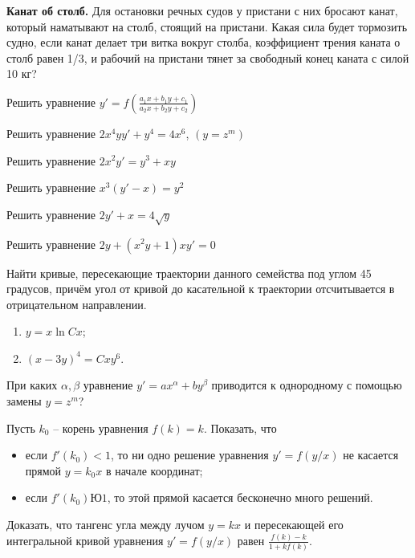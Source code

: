 \begin{task}
\textbf{Канат об столб.} Для остановки речных судов у пристани с них бросают канат, который наматывают на столб, стоящий на пристани. Какая сила будет тормозить судно, если канат делает три витка вокруг столба, коэффициент трения каната о столб равен 1/3, и рабочий на пристани тянет за свободный конец каната с силой 10 кг?
\end{task}

\begin{task}
Решить уравнение $y'=f(\frac{a_1x+b_1y+c_1}{a_2x+b_2y+c_2})$
\end{task}

\begin{task}
Решить уравнение $2x^4yy'+y^4=4x^6$, $(y=z^m)$
\end{task}

\begin{task}
Решить уравнение $2x^2y'=y^3+xy$
\end{task}

\begin{task}
Решить уравнение $x^3(y'-x)=y^2$
\end{task}

\begin{task}
Решить уравнение $2y'+x=4\sqrt{y}$
\end{task}

\begin{task}
Решить уравнение $2y+(x^2y+1)xy'=0$
\end{task}

\begin{task}
Найти кривые, пересекающие траектории данного семейства под углом 45 градусов, причём угол от  кривой до касательной к траектории отсчитывается в отрицательном направлении.
\begin{enumerate}
    \item $y=x\ln Cx$;
    \item $(x-3y)^4=Cxy^6$.
\end{enumerate}
\end{task}

\begin{task}
При каких $\alpha, \beta$ уравнение $y'=ax^\alpha+by^\beta$ приводится к однородному с помощью замены $y=z^m$?
\end{task}

\begin{task}
Пусть $k_0$ -- корень уравнения $f(k)=k$. Показать, что 
\begin{itemize}
    \item если $f'(k_0)<1 $, то ни одно решение уравнения $y'=f(y/x)$ не касается прямой $y=k_0x$ в начале координат;
    \item если $f'(k_0)Ю1 $, то этой прямой касается бесконечно много решений.
\end{itemize}

\end{task}


\begin{task}
Доказать, что тангенс угла между лучом $y=kx$ и пересекающей его интегральной кривой уравнения $y'=f(y/x)$ равен $\frac{f(k)-k}{1+kf(k)}$.
\end{task}

